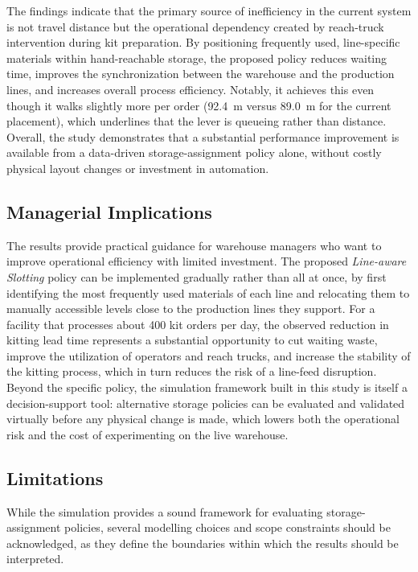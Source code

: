 \documentclass[12pt,a4paper]{article}
\newcommand{\policy}[1]{\textit{#1}}
\begin{document}
The findings indicate that the primary source of inefficiency in the current
system is not travel distance but the operational dependency created by
reach-truck intervention during kit preparation. By positioning frequently
used, line-specific materials within hand-reachable storage, the proposed
policy reduces waiting time, improves the synchronization between the
warehouse and the production lines, and increases overall process efficiency.
Notably, it achieves this even though it walks slightly more per order
(92.4~m versus 89.0~m for the current placement), which underlines that the
lever is queueing rather than distance. Overall, the study demonstrates that a
substantial performance improvement is available from a data-driven
storage-assignment policy alone, without costly physical layout changes or
investment in automation.

\subsection{Managerial Implications}
The results provide practical guidance for warehouse managers who want to
improve operational efficiency with limited investment. The proposed
\policy{Line-aware Slotting} policy can be implemented gradually rather than
all at once, by first identifying the most frequently used materials of each
line and relocating them to manually accessible levels close to the production
lines they support. For a facility that processes about 400 kit orders per
day, the observed reduction in kitting lead time represents a substantial
opportunity to cut waiting waste, improve the utilization of operators and
reach trucks, and increase the stability of the kitting process, which in turn
reduces the risk of a line-feed disruption. Beyond the specific policy, the
simulation framework built in this study is itself a decision-support tool:
alternative storage policies can be evaluated and validated virtually before
any physical change is made, which lowers both the operational risk and the
cost of experimenting on the live warehouse.

\subsection{Limitations}
While the simulation provides a sound framework for evaluating
storage-assignment policies, several modelling choices and scope constraints
should be acknowledged, as they define the boundaries within which the results
should be interpreted.
\end{document}

